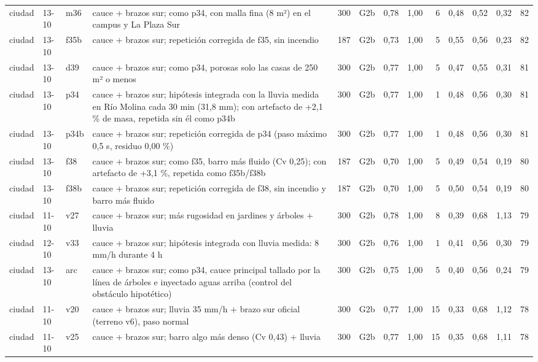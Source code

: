 {\begin{longtable}{lll>{\raggedright\arraybackslash}p{3.3cm}rlrrrrrrr}
ciudad & 13-10 & m36 & cauce + brazos sur; como p34, con malla fina (8 m²) en el campus y La Plaza Sur & 300 & G2b & 0{,}78 & 1{,}00 & 6 & 0{,}48 & 0{,}52 & 0{,}32 & 82\\
ciudad & 13-10 & f35b & cauce + brazos sur; repetición corregida de f35, sin incendio & 187 & G2b & 0{,}73 & 1{,}00 & 5 & 0{,}55 & 0{,}56 & 0{,}23 & 82\\
ciudad & 13-10 & d39 & cauce + brazos sur; como p34, porosas solo las casas de 250 m² o menos & 300 & G2b & 0{,}77 & 1{,}00 & 5 & 0{,}47 & 0{,}55 & 0{,}31 & 81\\
ciudad & 13-10 & p34 & cauce + brazos sur; hipótesis integrada con la lluvia medida en Río Molina cada 30 min (31,8 mm); con artefacto de +2,1 \% de masa, repetida sin él como p34b & 300 & G2b & 0{,}77 & 1{,}00 & 1 & 0{,}48 & 0{,}56 & 0{,}30 & 81\\
ciudad & 13-10 & p34b & cauce + brazos sur; repetición corregida de p34 (paso máximo 0,5 s, residuo 0,00 \%) & 300 & G2b & 0{,}77 & 1{,}00 & 1 & 0{,}48 & 0{,}56 & 0{,}30 & 81\\
ciudad & 13-10 & f38 & cauce + brazos sur; como f35, barro más fluido (Cv 0,25); con artefacto de +3,1 \%, repetida como f35b/f38b & 187 & G2b & 0{,}70 & 1{,}00 & 5 & 0{,}49 & 0{,}54 & 0{,}19 & 80\\
ciudad & 13-10 & f38b & cauce + brazos sur; repetición corregida de f38, sin incendio y barro más fluido & 187 & G2b & 0{,}70 & 1{,}00 & 5 & 0{,}50 & 0{,}54 & 0{,}19 & 80\\
ciudad & 11-10 & v27 & cauce + brazos sur; más rugosidad en jardines y árboles + lluvia & 300 & G2b & 0{,}78 & 1{,}00 & 8 & 0{,}39 & 0{,}68 & 1{,}13 & 79\\
ciudad & 12-10 & v33 & cauce + brazos sur; hipótesis integrada con lluvia medida: 8 mm/h durante 4 h & 300 & G2b & 0{,}76 & 1{,}00 & 1 & 0{,}41 & 0{,}56 & 0{,}30 & 79\\
ciudad & 13-10 & arc & cauce + brazos sur; como p34, cauce principal tallado por la línea de árboles e inyectado aguas arriba (control del obstáculo hipotético) & 300 & G2b & 0{,}75 & 1{,}00 & 5 & 0{,}40 & 0{,}56 & 0{,}24 & 79\\
ciudad & 11-10 & v20 & cauce + brazos sur; lluvia 35 mm/h + brazo sur oficial (terreno v6), paso normal & 300 & G2b & 0{,}77 & 1{,}00 & 15 & 0{,}33 & 0{,}68 & 1{,}12 & 78\\
ciudad & 11-10 & v25 & cauce + brazos sur; barro algo más denso (Cv 0,43) + lluvia & 300 & G2b & 0{,}77 & 1{,}00 & 15 & 0{,}35 & 0{,}68 & 1{,}11 & 78\\

\end{longtable}}
